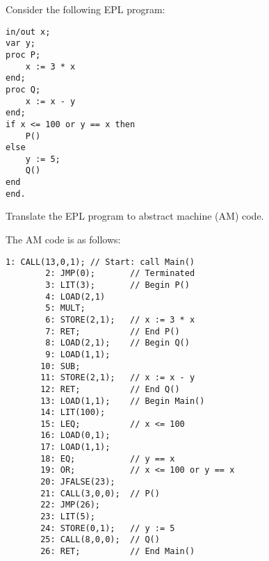 \begin{exercise}{30}
Consider the following EPL program:
\begin{lstlisting}[numbers=none]
in/out x;
var y;
proc P;
	x := 3 * x
end;
proc Q;
	x := x - y
end;
if x <= 100 or y == x then
	P()
else
    y := 5;
	Q()
end
end.
\end{lstlisting}


Translate the EPL program to abstract machine (AM) code.

\end{exercise}

\begin{solution}
    The AM code is as follows:
    \begin{lstlisting}[numbers=none]
        1: CALL(13,0,1); // Start: call Main()
        2: JMP(0);       // Terminated
        3: LIT(3);       // Begin P()
        4: LOAD(2,1)
        5: MULT;
        6: STORE(2,1);   // x := 3 * x
        7: RET;          // End P()
        8: LOAD(2,1);    // Begin Q()
        9: LOAD(1,1);
       10: SUB;
       11: STORE(2,1);   // x := x - y
       12: RET;          // End Q()
       13: LOAD(1,1);    // Begin Main()
       14: LIT(100);
       15: LEQ;          // x <= 100
       16: LOAD(0,1);
       17: LOAD(1,1);
       18: EQ;           // y == x
       19: OR;           // x <= 100 or y == x
       20: JFALSE(23);
       21: CALL(3,0,0);  // P()
       22: JMP(26);
       23: LIT(5);
       24: STORE(0,1);   // y := 5
       25: CALL(8,0,0);  // Q()
       26: RET;          // End Main()
    \end{lstlisting}
\end{solution}
